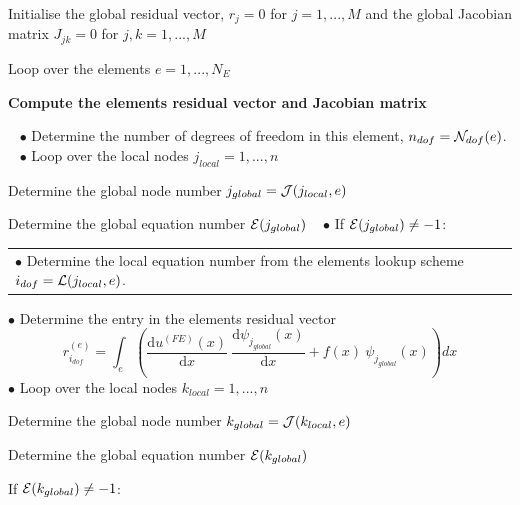 \begin{DoxyItemize}
\item Initialise the global residual vector, $ r_j=0 $ for $j=1,...,M $ and the global Jacobian matrix $ J_{jk}=0 $ for $j,k=1,...,M $
\item Loop over the elements $ e=1,...,N_E$ ~\newline
~\newline
 \begin{center} {\bfseries  Compute the element\textquotesingle{}s residual vector and Jacobian matrix } \end{center}  ~\newline
 $ \bullet $ Determine the number of degrees of freedom in this element, $ n_{dof}={\cal N}_{dof}(e) $. ~\newline
 $ \bullet $ Loop over the local nodes $ j_{local}=1,...,n $ ~\newline

\begin{DoxyItemize}
\item Determine the global node number $ j_{global}={\cal J}(j_{local},e)$
\item Determine the global equation number $ {\cal E}( j_{global}) $ ~\newline
 $ \bullet $ If $ {\cal E}( j_{global}) \ne -1 $\+: ~\newline
 \tabulinesep=1mm
\begin{longtabu} spread 0pt [c]{*{1}{|X[-1]}|}
\hline
$ \bullet $ Determine the local equation number from the element\textquotesingle{}s lookup scheme $ i_{dof}= {\cal L}(j_{local},e)$.   \\
\end{longtabu}
$ \bullet $ Determine the entry in the element\textquotesingle{}s residual vector \[ r_{i_{dof}}^{(e)} = \int_{e} \left( \frac{\mbox{d} u^{(FE)}(x)}{\mbox{d} x} \ \frac{\mbox{d} \psi_{j_{global}}(x)}{\mbox{d} x} + f(x) \ \psi_{j_{global}}(x) \right) dx \] $ \bullet $ Loop over the local nodes $ k_{local}=1,...,n $
\begin{DoxyItemize}
\item Determine the global node number $ k_{global}={\cal J}(k_{local},e)$
\item Determine the global equation number $ {\cal E}( k_{global}) $
\item If $ {\cal E}( k_{global}) \ne -1 $\+: \tabulinesep=1mm
\begin{longtabu} spread 0pt [c]{*{1}{|X[-1]}|}
\hline


\end{longtabu}
\end{DoxyItemize}
\end{DoxyItemize}
\end{DoxyItemize}
